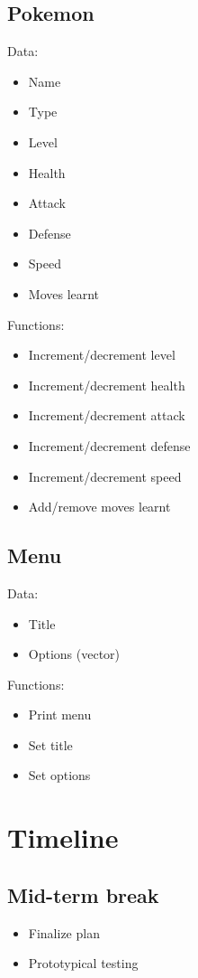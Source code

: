 \documentclass{article}
\begin{document}
  \subsection{Pokemon}
  Data:
  \begin{itemize}
    \item Name
    \item Type
    \item Level
    \item Health
    \item Attack
    \item Defense
    \item Speed
    \item Moves learnt
  \end{itemize}
  Functions:
  \begin{itemize}
    \item Increment/decrement level
    \item Increment/decrement health
    \item Increment/decrement attack
    \item Increment/decrement defense
    \item Increment/decrement speed
    \item Add/remove moves learnt
  \end{itemize}
  
  \subsection{Menu}
  Data:
  \begin{itemize}
    \item Title
    \item Options (vector)
  \end{itemize}
  Functions:
  \begin{itemize}
    \item Print menu
    \item Set title
    \item Set options
  \end{itemize}
  
  \pagebreak
  
  \section{Timeline}
  
  \subsection*{Mid-term break}
  \begin{itemize}
    \item Finalize plan
    \item Prototypical testing
  \end{itemize}
  
\end{document}
